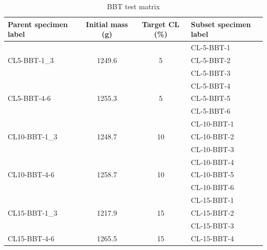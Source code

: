 \begin{table}[htbp]
\caption{BBT test matrix}
\label{tab:bbt_matrix}
\centering
\begin{tabular}{lccl}
Parent specimen label          & Initial mass (g)        & Target CL (\%)      & Subset specimen label \\ \hline
\multirow{3}{*}{CL5-BBT-1\_3}  & \multirow{3}{*}{1249.6} & \multirow{3}{*}{5}  & CL-5-BBT-1            \\
                               &                         &                     & CL-5-BBT-2            \\
                               &                         &                     & CL-5-BBT-3            \\
\multirow{3}{*}{CL5-BBT-4-6}   & \multirow{3}{*}{1255.3} & \multirow{3}{*}{5}  & CL-5-BBT-4            \\
                               &                         &                     & CL-5-BBT-5            \\
                               &                         &                     & CL-5-BBT-6            \\
\multirow{3}{*}{CL10-BBT-1\_3} & \multirow{3}{*}{1248.7} & \multirow{3}{*}{10} & CL-10-BBT-1           \\
                               &                         &                     & CL-10-BBT-2           \\
                               &                         &                     & CL-10-BBT-3           \\
\multirow{3}{*}{CL10-BBT-4-6}  & \multirow{3}{*}{1258.7} & \multirow{3}{*}{10} & CL-10-BBT-4           \\
                               &                         &                     & CL-10-BBT-5           \\
                               &                         &                     & CL-10-BBT-6           \\
\multirow{3}{*}{CL15-BBT-1\_3} & \multirow{3}{*}{1217.9} & \multirow{3}{*}{15} & CL-15-BBT-1           \\
                               &                         &                     & CL-15-BBT-2           \\
                               &                         &                     & CL-15-BBT-3           \\
\multirow{3}{*}{CL15-BBT-4-6}  & \multirow{3}{*}{1265.5} & \multirow{3}{*}{15} & CL-15-BBT-4           \\

\end{tabular}
\end{table}
